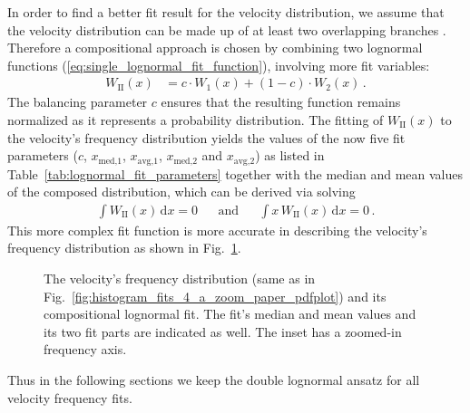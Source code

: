 In order to find a better fit result for the velocity distribution, we assume that the velocity distribution can be made up of at least two overlapping branches \citep{McGregor2011b}. Therefore a compositional approach  is chosen by combining two lognormal functions (\ref{eq:single_lognormal_fit_function}), involving more fit variables:
\begin{align}
	W_\text{II}(x) &= c \cdot W_1(x) + (1 -c) \cdot W_2(x)\,.	\label{eq:double_lognormal_fit_function}
\end{align}
The balancing parameter $c$ ensures that the resulting function remains normalized as it represents a probability distribution.
The fitting of $W_\text{II}(x)$ to the velocity's frequency distribution yields the values of the now five fit parameters ($c$, $x_\text{med,1}$, $x_\text{avg,1}$, $x_\text{med,2}$ and $x_\text{avg,2}$) as listed in Table~\ref{tab:lognormal_fit_parameters} together with the median and mean values of the composed distribution, which can be derived via solving
\begin{align}
	\int W_\text{II}(x)\,\text{d}x = 0	&	&\text{and}	&	&\int x\,W_\text{II}(x)\,\text{d}x = 0	\,.
\end{align}
This more complex fit function is more accurate in describing the velocity's frequency distribution as shown in Fig.~\ref{fig:histogram_fits_V_a_zoom_dbl_paper_pdfplot}.
\begin{figure}
	\caption{The velocity's frequency distribution (same as in Fig.~\ref{fig:histogram_fits_4_a_zoom_paper_pdfplot}) and its compositional lognormal fit. The fit's median and mean values and its two fit parts are indicated as well. The inset has a zoomed-in frequency axis.}
	\label{fig:histogram_fits_V_a_zoom_dbl_paper_pdfplot}
\end{figure}
Thus in the following sections we keep the double lognormal ansatz for all velocity frequency fits.

